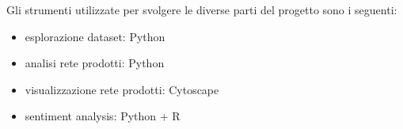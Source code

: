 



Gli strumenti utilizzate per svolgere le diverse parti del progetto sono i seguenti:
\begin{itemize}
    \item esplorazione dataset: Python
    \item analisi rete prodotti: Python
    \item visualizzazione rete prodotti: Cytoscape
    \item sentiment analysis: Python + R
\end{itemize}